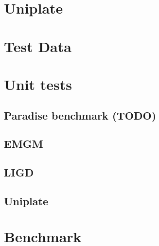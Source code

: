 \documentclass[abstracton,parskip=half]{scrreprt}
\begin{document}
    \section{Uniplate}
    
    \section{Test Data}
    
    \section{Unit tests}
    \subsection{Paradise benchmark (TODO)}
    
    \subsection{EMGM}
    
    \subsection{LIGD}
    
    \subsection{Uniplate}
    

    \section{Benchmark}
    
\end{document}
